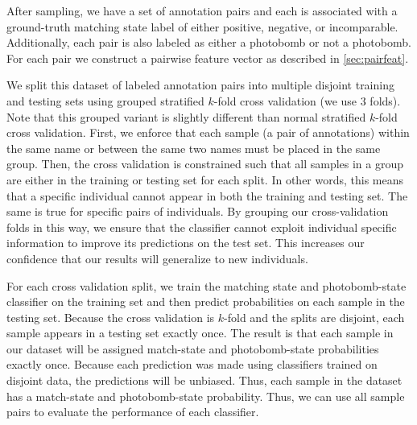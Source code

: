     \PairDBStats{}


    After sampling, we have a set of annotation pairs and each is associated with a ground-truth matching state
      label of either positive, negative, or incomparable.
    Additionally, each pair is also labeled as either a photobomb or not a photobomb.
    For each pair we construct a pairwise feature vector as described in \cref{sec:pairfeat}.

    We split this dataset of labeled annotation pairs into multiple disjoint training and testing sets using
      grouped stratified $k$-fold cross validation (we use $3$ folds).
    Note that this grouped variant is slightly different than normal stratified $k$-fold cross validation.
    First, we enforce that each sample (a pair of annotations) within the same name or between the same two names
      must be placed in the same group.
    Then, the cross validation is constrained such that all samples in a group are either in the training or
      testing set for each split.
    In other words, this means that a specific individual cannot appear in both the training and testing set.
    The same is true for specific pairs of individuals.
    By grouping our cross-validation folds in this way, we ensure that the classifier cannot exploit individual
      specific information to improve its predictions on the test set.
    This increases our confidence that our results will generalize to new individuals.

    For each cross validation split, we train the matching state and photobomb-state classifier on the training
      set and then predict probabilities on each sample in the testing set.
    Because the cross validation is $k$-fold and the splits are disjoint, each sample appears in a testing set
      exactly once.
    The result is that each sample in our dataset will be assigned match-state and photobomb-state probabilities
      exactly once.
    Because each prediction was made using classifiers trained on disjoint data, the predictions will be
      unbiased.
    Thus, each sample in the dataset has a match-state and photobomb-state probability.
    Thus, we can use all sample pairs to evaluate the performance of each classifier.

